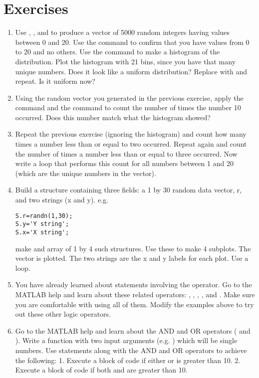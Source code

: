 \documentclass{article}
\begin{document}
\section*{Exercises}
\begin{enumerate}

\item Use , , and \mcode{*} to produce a vector of 5000 random integers having values between 0 and 20.
Use the  command to confirm that you have values from 0 to 20 and no others. Use the  command to make a histogram of the distribution. Plot the histogram with 21 bins, since you have that many unique numbers. Does it look like a uniform distribution? Replace  with  and repeat. Is it uniform now?

\item Using the random vector you generated in the previous exercise, apply the  command and the  command to count the number of times the number 10 occurred. Does this number match what the histogram showed?

\item Repeat the previous exercise (ignoring the histogram) and count how many times a number less than or equal to two occurred. Repeat again and count the number of times a number less than or equal to three occurred. Now write a  loop that performs this count for all numbers between 1 and 20 (which are the unique numbers in the vector).

\item Build a structure containing three fields: a 1 by 30 random data vector, r, and two strings (x and y).  e.g.
\begin{lstlisting}
S.r=randn(1,30);
S.y='Y string';
S.x='X string';
\end{lstlisting}


make and array of 1 by 4 such structures. Use these to make 4 subplots. The vector is plotted. The two strings are the x and y labels for each plot. Use a loop.

\item You have already learned about  statements involving the \mcode{==} operator. Go to the MATLAB help and learn about these related operators: \mcode{<}, \mcode{>}, \mcode{!=}, \mcode{>=}, and \mcode{<=}. Make sure you are comfortable with using all of them. Modify the  examples above to try out these other logic operators.

\item Go to the MATLAB help and learn about the AND and OR operators (\mcode{&} and \mcode{\|}). Write a function with two input arguments (e.g. ) which will be single numbers. Use  statements along with the AND and OR operators to achieve the following: 1. Execute a block of code if either  or  is greater than 10.  2. Execute a block of code if both  and  are greater than 10.


\end{enumerate}
\end{document}

